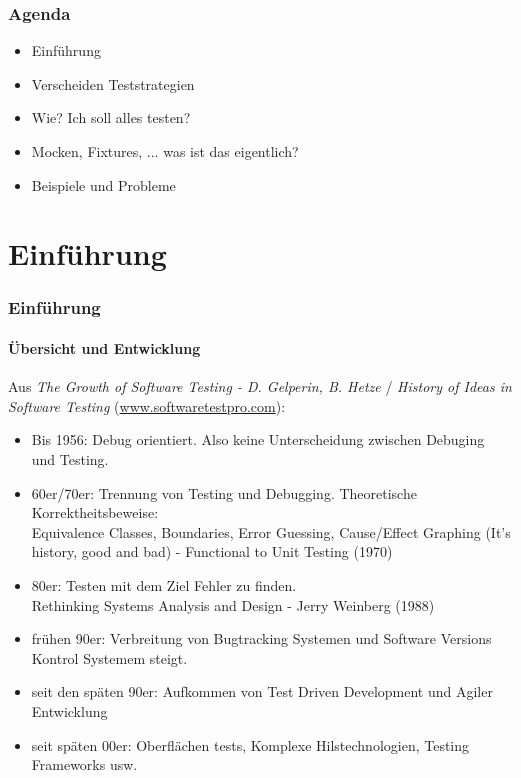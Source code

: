\begin{frame}
  \titlepage
\end{frame}

\begin{frame}
  \frametitle{Agenda}

  \begin{itemize}
    \item Einführung
    \item Verscheiden Teststrategien
    \item Wie? Ich soll alles testen?
    \item Mocken, Fixtures, ... was ist das eigentlich?
    \item Beispiele und Probleme
  \end{itemize}
\end{frame}

\section{Einführung}
\begin{frame}
  \frametitle{Einführung}
  \framesubtitle{Übersicht und Entwicklung}
  Aus \textit{The Growth of Software Testing - D. Gelperin, B. Hetze} / \textit{History of Ideas in Software Testing} (\url{www.softwaretestpro.com}):

    \begin{itemize}
      \item Bis 1956: Debug orientiert. Also keine Unterscheidung zwischen Debuging und Testing.
        \pause
      \item 60er/70er: Trennung von Testing und Debugging. Theoretische Korrektheitsbeweise:\\
        Equivalence Classes, Boundaries, Error Guessing, Cause/Effect Graphing (It's history, good and bad) - Functional to Unit Testing (1970)
        \pause
      \item 80er: Testen mit dem Ziel Fehler zu finden.\\
        Rethinking Systems Analysis and Design -  Jerry Weinberg  (1988)
        \pause
      \item frühen 90er: Verbreitung von Bugtracking Systemen und Software Versions Kontrol Systemem steigt.
        \pause
      \item seit den späten 90er:  Aufkommen von Test Driven Development und Agiler Entwicklung
        \pause
      \item seit späten 00er: Oberflächen tests, Komplexe Hilstechnologien, Testing Frameworks usw.
        \pause
    \end{itemize}

\end{frame}


